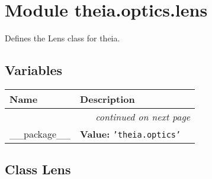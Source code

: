 %
%
%


\section{Module theia.optics.lens}

    \label{theia:optics:lens}
Defines the Lens class for theia.



  \subsection{Variables}

    \vspace{-1cm}
\hspace{\varindent}\begin{longtable}{|p{\varnamewidth}|p{\vardescrwidth}|l}
\cline{1-2}
\cline{1-2} \centering \textbf{Name} & \centering \textbf{Description}& \\
\cline{1-2}
\endhead\cline{1-2}\multicolumn{3}{r}{\small\textit{continued on next page}}\\\endfoot\cline{1-2}
\endlastfoot\raggedright \_\-\_\-p\-a\-c\-k\-a\-g\-e\-\_\-\_\- & \raggedright \textbf{Value:} 
{\tt \texttt{'}\texttt{theia.optics}\texttt{'}}&\\
\cline{1-2}
\end{longtable}



\subsection{Class Lens}


